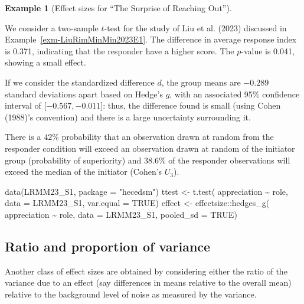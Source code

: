 \documentclass[
  11pt,
  letterpaper,
]{scrbook}
\newenvironment{Shaded}{\begin{snugshade}}{\end{snugshade}}
\newcommand{\AttributeTok}[1]{\textcolor[rgb]{0.40,0.45,0.13}{#1}}
\newcommand{\ConstantTok}[1]{\textcolor[rgb]{0.56,0.35,0.01}{#1}}
\newcommand{\FunctionTok}[1]{\textcolor[rgb]{0.28,0.35,0.67}{#1}}
\newcommand{\NormalTok}[1]{\textcolor[rgb]{0.00,0.23,0.31}{#1}}
\newcommand{\OtherTok}[1]{\textcolor[rgb]{0.00,0.23,0.31}{#1}}
\newcommand{\SpecialCharTok}[1]{\textcolor[rgb]{0.37,0.37,0.37}{#1}}
\newcommand{\StringTok}[1]{\textcolor[rgb]{0.13,0.47,0.30}{#1}}
\theoremstyle{definition}
\theoremstyle{definition}
\newtheorem{example}{Example}[chapter]
\theoremstyle{remark}
\begin{document}
\begin{example}[Effect sizes for ``The Surprise of Reaching
Out'']\protect\hypertarget{exm-LiuRimMinMin2023E1effect}{}\label{exm-LiuRimMinMin2023E1effect}

We consider a two-sample \(t\)-test for the study of Liu et al. (2023)
discussed in Example~\ref{exm-LiuRimMinMin2023E1}. The difference in
average response index is 0.371, indicating that the responder have a
higher score. The \(p\)-value is 0.041, showing a small effect.

If we consider the standardized difference \(d\), the group means are
\(-0.289\) standard deviations apart based on Hedge's \(g\), with an
associated 95\% confidence interval of {[}\(-0.567, -0.011\){]}: thus,
the difference found is small (using Cohen (1988)'s convention) and
there is a large uncertainty surrounding it.

There is a \(42\)\% probability that an observation drawn at random from
the responder condition will exceed an observation drawn at random of
the initiator group (probability of superiority) and \(38.6\)\% of the
responder observations will exceed the median of the initiator (Cohen's
\(U_3\)).

\begin{Shaded}
\begin{Highlighting}[]
\FunctionTok{data}\NormalTok{(LRMM23\_S1, }\AttributeTok{package =} \StringTok{"hecedsm"}\NormalTok{)}
\NormalTok{ttest }\OtherTok{\textless{}{-}} \FunctionTok{t.test}\NormalTok{(}
\NormalTok{  appreciation }\SpecialCharTok{\textasciitilde{}}\NormalTok{ role, }
  \AttributeTok{data =}\NormalTok{ LRMM23\_S1,}
  \AttributeTok{var.equal =} \ConstantTok{TRUE}\NormalTok{)}
\NormalTok{effect }\OtherTok{\textless{}{-}}\NormalTok{ effectsize}\SpecialCharTok{::}\FunctionTok{hedges\_g}\NormalTok{(}
\NormalTok{  appreciation }\SpecialCharTok{\textasciitilde{}}\NormalTok{ role, }
  \AttributeTok{data =}\NormalTok{ LRMM23\_S1, }
  \AttributeTok{pooled\_sd =} \ConstantTok{TRUE}\NormalTok{)}
\end{Highlighting}
\end{Shaded}

\end{example}

\subsection{Ratio and proportion of
variance}\label{ratio-and-proportion-of-variance}

Another class of effect sizes are obtained by considering either the
ratio of the variance due to an effect (say differences in means
relative to the overall mean) relative to the background level of noise
as measured by the variance.
\end{document}
